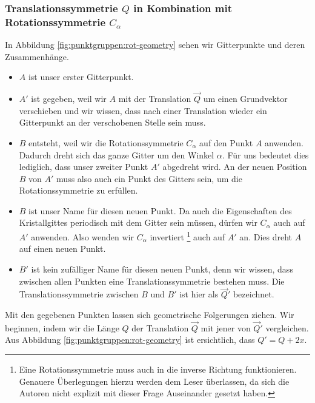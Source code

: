  \subsubsection{Translationssymmetrie $Q$ in Kombination mit Rotationssymmetrie $C_\alpha$}     %
 In Abbildung \ref{fig:punktgruppen:rot-geometry} sehen wir Gitterpunkte und deren Zusammenhänge.

 \begin{itemize}
     \item  \(A\) ist unser erster Gitterpunkt. 

     \item  \(A'\) ist gegeben, weil wir \(A\) mit der Translation \(\vec{Q}\) um einen Grundvektor verschieben und wir wissen, dass nach einer Translation wieder ein Gitterpunkt an der verschobenen Stelle sein muss.
     \item \(B\) entsteht, weil wir die Rotationssymmetrie \(C_\alpha\) auf den Punkt \(A\) anwenden.
         Dadurch dreht sich das ganze Gitter um den Winkel \(\alpha\). 
         Für uns bedeutet dies lediglich, dass unser zweiter Punkt \(A'\) abgedreht wird.
         An der neuen Position \(B\) von \(A'\) muss also auch ein Punkt des Gitters sein, um die Rotationssymmetrie zu erfüllen.
     \item \(B\) ist unser Name für diesen neuen Punkt.
         Da auch die Eigenschaften des Kristallgittes periodisch mit dem Gitter sein müssen, dürfen wir \(C_\alpha\) auch auf \(A'\) anwenden.
         Also wenden wir \(C_\alpha\) invertiert
         \footnote{Eine Rotationssymmetrie muss auch in die inverse Richtung funktionieren.
         Genauere Überlegungen hierzu werden dem Leser überlassen, da sich die Autoren nicht explizit mit dieser Frage Auseinander gesetzt haben.} 
         auch auf \(A'\) an. 
         Dies dreht \(A\) auf einen neuen Punkt.
     \item \(B'\) ist kein zufälliger Name für diesen neuen Punkt, denn wir wissen, dass zwischen allen Punkten eine Translationssymmetrie bestehen muss.
         Die Translationssymmetrie zwischen \(B\) und \(B'\) ist hier als \(\vec{Q}'\) bezeichnet.
 \end{itemize}  
 Mit den gegebenen Punkten lassen sich geometrische Folgerungen ziehen.
 Wir beginnen, indem wir die Länge \(Q\) der Translation \(\vec{Q}\) mit jener von \(\vec{Q}'\) vergleichen.
 Aus Abbildung \ref{fig:punktgruppen:rot-geometry} ist ersichtlich, dass \(Q' = Q + 2x\).
